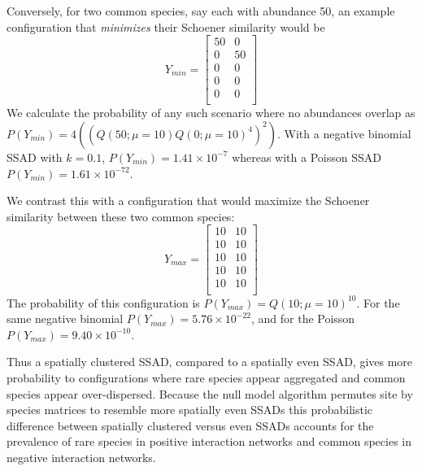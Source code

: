 \documentclass[]{article}
\begin{document}
Conversely, for two common species, say each with abundance 50, an
example configuration that \emph{minimizes} their Schoener similarity
would be \[
Y_{min} = \begin{bmatrix} 50 & 0 \\ 0 & 50 \\ 0 & 0 \\ 0 & 0 \\ 0 & 0 \\ \end{bmatrix}
\] We calculate the probability of any such scenario where no abundances
overlap as
\(P(Y_{min}) = 4 \left(\left(Q(50; \mu = 10) Q(0; \mu = 10)^{4}\right)^2\right)\).
With a negative binomial SSAD with \(k = 0.1\),
\(P(Y_{min}) = 1.41 \times 10^{-7}\) whereas with a Poisson SSAD
\(P(Y_{min}) = 1.61 \times 10^{-72}\).

We contrast this with a configuration that would maximize the Schoener
similarity between these two common species: \[
Y_{max} = \begin{bmatrix} 10 & 10 \\ 10 & 10 \\ 10 & 10 \\ 10 & 10 \\ 10 & 10 \\ \end{bmatrix}
\] The probability of this configuration is
\(P(Y_{max}) = Q(10; \mu = 10)^{10}\). For the same negative binomial
\(P(Y_{max}) = 5.76 \times 10^{-22}\), and for the Poisson
\(P(Y_{max}) = 9.40 \times 10^{-10}\).

Thus a spatially clustered SSAD, compared to a spatially even SSAD,
gives more probability to configurations where rare species appear
aggregated and common species appear over-dispersed. Because the null
model algorithm permutes site by species matrices to resemble more
spatially even SSADs this probabilistic difference between spatially
clustered versus even SSADs accounts for the prevalence of rare species
in positive interaction networks and common species in negative
interaction networks.
\end{document}
